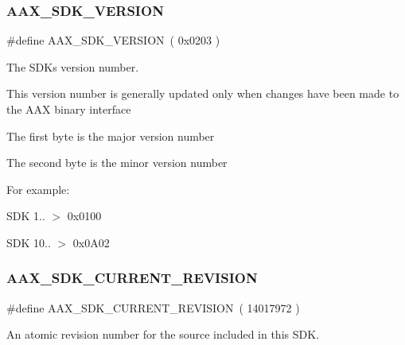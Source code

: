\mbox{\label{a00707_aeff268cb7f4d2cc612df086c22b0f1f2}} 
\subsubsection{\texorpdfstring{AAX\_SDK\_VERSION}{AAX\_SDK\_VERSION}}
{\footnotesize\ttfamily \#define A\+A\+X\+\_\+\+S\+D\+K\+\_\+\+V\+E\+R\+S\+I\+ON~( 0x0203 )}



The S\+DK\textquotesingle{}s version number. 

This version number is generally updated only when changes have been made to the A\+AX binary interface


\begin{DoxyItemize}
\item The first byte is the major version number
\item The second byte is the minor version number
\end{DoxyItemize}

For example\+:
\begin{DoxyItemize}
\item S\+DK 1.. $>$ {\ttfamily 0x0100} 
\item S\+DK 10.. $>$ {\ttfamily 0x0\+A02} 
\end{DoxyItemize}\mbox{\label{a00707_a7ae13fba5243735a59c3a4dc2554a36f}} 
\subsubsection{\texorpdfstring{AAX\_SDK\_CURRENT\_REVISION}{AAX\_SDK\_CURRENT\_REVISION}}
{\footnotesize\ttfamily \#define A\+A\+X\+\_\+\+S\+D\+K\+\_\+\+C\+U\+R\+R\+E\+N\+T\+\_\+\+R\+E\+V\+I\+S\+I\+ON~( 14017972 )}



An atomic revision number for the source included in this S\+DK. 

\mbox{\label{a00707_a3f59e1c5a5a7563eeefe64b5781eba93}} 
